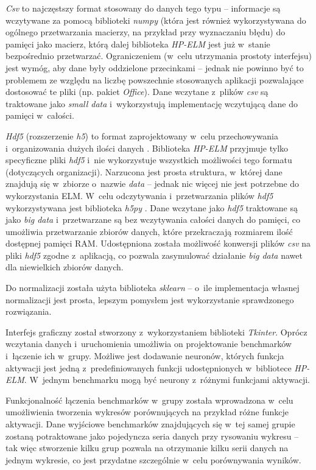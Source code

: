 \documentclass{article}
\begin{document}
\textit{Csv} to najczęstszy format stosowany do danych tego typu -- informacje są wczytywane za pomocą biblioteki \textit{numpy} \cite{numpy} (która jest również wykorzystywana do ogólnego przetwarzania macierzy, na przykład przy wyznaczaniu błędu) do pamięci jako macierz, którą dalej biblioteka \textit{HP-ELM} jest już w~stanie bezpośrednio przetwarzać. Ograniczeniem (w~celu utrzymania prostoty interfejsu) jest wymóg, aby dane były oddzielone przecinkami -- jednak nie powinno być to problemem ze względu na liczbę powszechnie stosowanych aplikacji pozwalające dostosować te pliki (np. pakiet \textit{Office}). Dane wczytane z~plików \textit{csv} są traktowane jako \textit{small data} i~wykorzystują implementację wczytującą dane do pamięci w~całości. 

\textit{Hdf5} (rozszerzenie \textit{h5}) to format zaprojektowany w~celu przechowywania i~organizowania dużych ilości danych \cite{hdf5}. Biblioteka \textit{HP-ELM} przyjmuje tylko specyficzne pliki \textit{hdf5} i~nie wykorzystuje wszystkich możliwości tego formatu (dotyczących organizacji). Narzucona jest prosta struktura, w~której dane znajdują się w~zbiorze o~nazwie \textit{data} -- jednak nic więcej nie jest potrzebne do wykorzystania ELM. W~celu odczytywania i~przetwarzania plików \textit{hdf5} wykorzystywana jest biblioteka \textit{h5py} \cite{h5py}. Dane wczytane jako \textit{hdf5} traktowane są jako \textit{big data} i~przetwarzane są bez wczytywania całości danych do pamięci, co umożliwia przetwarzanie zbiorów danych, które przekraczają rozmiarem ilość dostępnej pamięci RAM. Udostępniona została możliwość konwersji plików \textit{csv} na pliki \textit{hdf5} zgodne z~aplikacją, co pozwala zasymulować działanie \textit{big data} nawet dla niewielkich zbiorów danych.  

Do normalizacji została użyta biblioteka \textit{sklearn} \cite{sklearn} -- o~ile implementacja własnej normalizacji jest prosta, lepszym pomysłem jest wykorzystanie sprawdzonego rozwiązania.

Interfejs graficzny został stworzony z~wykorzystaniem biblioteki \textit{Tkinter}. Oprócz wczytania danych i~uruchomienia umożliwia on projektowanie benchmarków i~łączenie ich w~grupy. Możliwe jest dodawanie neuronów, których funkcja aktywacji jest jedną z~predefiniowanych funkcji udostępnionych w~bibliotece \textit{HP-ELM}. W~jednym benchmarku mogą być neurony z~różnymi funkcjami aktywacji. 

Funkcjonalność łączenia benchmarków w~grupy została wprowadzona w~celu umożliwienia tworzenia wykresów porównujących na przykład różne funkcje aktywacji. Dane wyjściowe benchmarków znajdujących się w~tej samej grupie zostaną potraktowane jako pojedyncza seria danych przy rysowaniu wykresu -- tak więc stworzenie kilku grup pozwala na otrzymanie kilku serii danych na jednym wykresie, co jest przydatne szczególnie w~celu porównywania wyników. 
\end{document}
